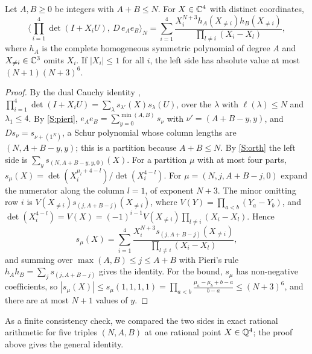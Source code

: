 \documentclass[11pt,colorlinks]{charlie}
\begin{document}
\begin{lemma}\label{lem:haar4}
Let $A,B\ge0$ be integers with $A+B\le N$. For $X\in\mathbb{C}^4$ with distinct coordinates,
\[
 \Big\langle\prod_{i=1}^4\det(I+X_iU),\ D\,e_Ae_B\Big\rangle_N=\sum_{i=1}^4\frac{X_i^{N+3}h_A(X_{\ne i})h_B(X_{\ne i})}{\prod_{l\ne i}(X_i-X_l)},
\]
where $h_A$ is the complete homogeneous symmetric polynomial of degree $A$ and $X_{\ne i}\in\mathbb{C}^3$ omits $X_i$. If $|X_i|\le1$ for all $i$, the left side has absolute value at most $(N+1)(N+3)^6$.
\end{lemma}
\begin{proof}
By the dual Cauchy identity \cite[I.(4.3$'$)]{Mac}, $\prod_{i=1}^4\det(I+X_iU)=\sum_\lambda s_{\lambda'}(X)s_\lambda(U)$, over the $\lambda$ with $\ell(\lambda)\le N$ and $\lambda_1\le4$. By \ref{S:pieri}, $e_Ae_B=\sum_{y=0}^{\min(A,B)}s_\nu$ with $\nu'=(A+B-y,y)$, and $Ds_\nu=s_{\nu+(1^N)}$, a Schur polynomial whose column lengths are $(N,A+B-y,y)$; this is a partition because $A+B\le N$. By \ref{S:orth} the left side is $\sum_{y}s_{(N,A+B-y,y,0)}(X)$. For a partition $\mu$ with at most four parts, $s_\mu(X)=\det(X_i^{\mu_l+4-l})/\det(X_i^{4-l})$. For $\mu=(N,j,A+B-j,0)$ expand the numerator along the column $l=1$, of exponent $N+3$. The minor omitting row $i$ is $V(X_{\ne i})s_{(j,A+B-j)}(X_{\ne i})$, where $V(Y)=\prod_{a<b}(Y_a-Y_b)$, and $\det(X_i^{4-l})=V(X)=(-1)^{i-1}V(X_{\ne i})\prod_{l\ne i}(X_i-X_l)$. Hence
\[
 s_\mu(X)=\sum_{i=1}^4\frac{X_i^{N+3}s_{(j,A+B-j)}(X_{\ne i})}{\prod_{l\ne i}(X_i-X_l)},
\]
and summing over $\max(A,B)\le j\le A+B$ with Pieri's rule $h_Ah_B=\sum_js_{(j,A+B-j)}$ \cite[I.(5.16)]{Mac} gives the identity. For the bound, $s_\mu$ has non-negative coefficients, so $|s_\mu(X)|\le s_\mu(1,1,1,1)=\prod_{a<b}\frac{\mu_a-\mu_b+b-a}{b-a}\le(N+3)^6$, and there are at most $N+1$ values of $y$.
\end{proof}
\noindent As a finite consistency check, we compared the two sides in exact rational arithmetic for five triples $(N,A,B)$ at one rational point $X\in\mathbb{Q}^4$; the proof above gives the general identity.
\end{document}

